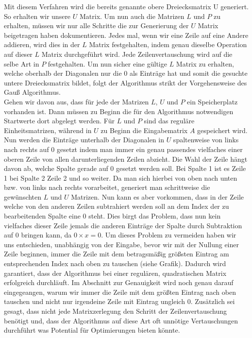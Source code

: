 \documentclass[course=erap]{aspdoc}
\begin{document}
Mit diesem Verfahren wird die bereits genannte obere Dreiecksmatrix U generiert. So erhalten wir unsere $U$ Matrix. 
Um nun auch die Matrizen $L$ und $P$ zu erhalten, müssen wir nur alle Schritte die zur Generierung 
der $U$ Matrix beigetragen haben dokumentieren. Jedes mal, wenn wir eine Zeile auf eine Andere addieren,
wird dies in der $L$ Matrix festgehalten, indem genau dieselbe Operation auf dieser $L$ Matrix durchgeführt wird. 
Jede Zeilenvertauschung wird auf die selbe Art in $P$ festgehalten.  Um nun sicher eine gültige $L$ Matrix zu erhalten, 
welche oberhalb der Diagonalen nur die 0 als Einträge hat und somit die gesuchte untere Dreiecksmatrix bildet, 
folgt der Algorithmus strikt der Vorgehensweise des Gauß Algorithmus.\\

Gehen wir davon aus, dass für jede der Matrizen $L$, $U$ und $P$ ein Speicherplatz vorhanden ist.
Dann müssen zu Beginn die für den Algorithmus notwendigen Startwerte dort abgelegt werden. Für $L$ und $P$ sind das 
reguläre Einheitsmatrizen, während in $U$ zu Beginn die Eingabematrix $A$ gespeichert wird. Nun werden die Einträge unterhalb 
der Diagonalen in $U$ spaltenweise von links nach rechts auf 0 gesetzt indem man immer ein genau passendes vielfaches 
einer oberen Zeile von allen darunterliegenden Zeilen abzieht. Die Wahl der Zeile hängt davon ab, welche Spalte gerade 
auf 0 gesetzt werden soll. Bei Spalte 1 ist es Zeile 1 bei Spalte 2 Zeile 2 und so weiter. Da man sich hierbei von oben 
nach unten bzw. von links nach rechts vorarbeitet, generiert man schrittweise die gewünschten $L$ und $U$ Matrizen. 
Nun kann es aber vorkommen, dass in der Zeile welche von den anderen Zeilen subtrahiert werden soll an dem Index 
der zu bearbeitenden Spalte eine 0 steht. Dies birgt das Problem, dass nun kein vielfaches dieser Zeile jemals 
die anderen Einträge der Spalte durch Subtraktion auf 0 bringen kann, da $ 0 \times x = 0$. Um dieses Problem zu vermeiden 
haben wir uns entschieden, unabhängig von der Eingabe, bevor wir mit der Nullung einer Zeile beginnen, immer die Zeile mit dem betragsmäßig größsten Eintrag
am entsprechenden Index nach oben zu tauschen (siehe Grafik). Dadurch wird garantiert, dass der Algorithmus bei einer 
regulären, quadratischen Matrix erfolgreich durchläuft. Im Abschnitt zur Genauigkeit wird noch genau darauf 
eingegeangen, warum wir immer die Zeile mit dem größten Eintrag nach oben tauschen und nicht nur irgendeine Zeile 
mit Eintrag ungleich 0. Zusätzlich sei gesagt, dass nicht jede Matrixzerlegung den Schritt der Zeilenvertauschung 
benötigt und, dass der Algorithmus auf diese Art oft unnötige Vertauschungen durchführt was Potential für 
Optimierungen bieten könnte.\\
 
\end{document}
